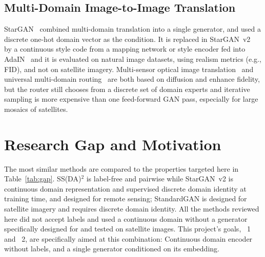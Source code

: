 \documentclass[conference]{IEEEtran}
\begin{document}
\subsection{Multi-Domain Image-to-Image Translation}
StarGAN~\cite{choi2018stargan} combined multi-domain translation into a single generator, and used a discrete one-hot domain vector as the condition. It is replaced in StarGAN~v2~\cite{choi2020starganv2} by a continuous style code from a mapping network or style encoder fed into AdaIN~\cite{huang2017adain} and it is evaluated on natural image datasets, using realism metrics (e.g., FID), and not on satellite imagery. Multi-sensor optical image translation~\cite{vinholi2024multisensor} and universal multi-domain routing~\cite{kieu2025universal} are both based on diffusion and enhance fidelity, but the router still chooses from a discrete set of domain experts and iterative sampling is more expensive than one feed-forward GAN pass, especially for large mosaics of satellites.

\section{Research Gap and Motivation}
The most similar methods are compared to the properties targeted here in Table~\ref{tab:gap}. SS(DA)$^2$ is label-free and pairwise while StarGAN~v2 is continuous domain representation and supervised discrete domain identity at training time, and designed for remote sensing; StandardGAN is designed for satellite imagery and requires discrete domain identity. All the methods reviewed here did not accept labels and used a continuous domain without a generator specifically designed for and tested on satellite images. This project's goals, ~1 and ~2, are specifically aimed at this combination: Continuous domain encoder without labels, and a single generator conditioned on its embedding.

\begin{table}[t]
\centering
\caption{Qualitative comparison of properties relevant to the identified research gap.}
\label{tab:gap}
\end{table}
\end{document}
